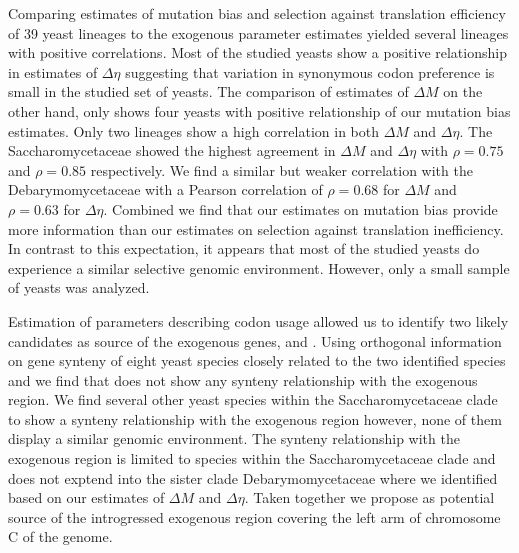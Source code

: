 \documentclass[12pt, letter]{article}
\begin{document}
Comparing estimates of mutation bias and selection against translation efficiency of 39 yeast lineages to the exogenous parameter estimates yielded several lineages with positive correlations.
Most of the studied yeasts show a positive relationship in estimates of $\Delta \eta$ suggesting that variation in synonymous codon preference is small in the studied set of yeasts.
The comparison of estimates of $\Delta M$ on the other hand, only shows four yeasts with positive relationship of our mutation bias estimates.
Only two lineages show a high correlation in both $\Delta M$ and $\Delta \eta$. %
The Saccharomycetaceae \gossypii showed the highest agreement in $\Delta M$ and $\Delta \eta$ with $\rho = 0.75$ and $\rho = 0.85$ respectively.
We find a similar but weaker correlation with the Debarymomycetaceae \dubl with a Pearson correlation of $\rho = 0.68$ for  $\Delta M$ and $\rho = 0.63$ for $\Delta \eta$.
Combined we find that our estimates on mutation bias provide more information than our estimates on selection against translation inefficiency.
In contrast to this expectation, it appears that most of the studied yeasts do experience a similar selective genomic environment.
However, only a small sample of yeasts was analyzed.

Estimation of parameters describing codon usage allowed us to identify two likely candidates as source of the exogenous genes, \gossypii and \dubl.
Using orthogonal information on gene synteny of eight yeast species closely related to the two identified species and \kluyveri we find that \dubl does not show any synteny relationship with the exogenous region. 
We find several other yeast species within the Saccharomycetaceae clade to show a synteny relationship with the exogenous region however, none of them display a similar genomic environment. 
The synteny relationship with the exogenous region is limited to species within the Saccharomycetaceae clade and does not exptend into the sister clade Debarymomycetaceae where we identified \dubl based on our estimates of $\Delta M$ and $\Delta \eta$.
Taken together we propose \gossypii as potential source of the introgressed exogenous region covering the left arm of chromosome C of the \kluyveri genome.
\end{document}
